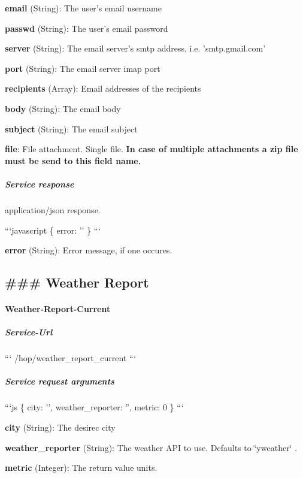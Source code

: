 \begin{DoxyItemize}
\item {\bfseries email} (String)\-: The user's email username
\item {\bfseries passwd} (String)\-: The user's email password
\item {\bfseries server} (String)\-: The email server's smtp address, i.\-e. 'smtp.\-gmail.\-com'
\item {\bfseries port} (String)\-: The email server imap port
\item {\bfseries recipients} (Array)\-: Email addresses of the recipients
\item {\bfseries body} (String)\-: The email body
\item {\bfseries subject} (String)\-: The email subject
\item {\bfseries file}\-: File attachment. Single file. {\bfseries In case of multiple attachments a zip file must be send to this field name.}
\end{DoxyItemize}

\subparagraph*{Service response}

application/json response.

```javascript \{ error\-: '' \} ```


\begin{DoxyItemize}
\item {\bfseries error} (String)\-: Error message, if one occures.
\end{DoxyItemize}



 \subsection*{\#\#\# Weather Report }

\paragraph*{Weather-\/\-Report-\/\-Current}

\subparagraph*{Service-\/\-Url}

``` /hop/weather\-\_\-report\-\_\-current ```

\subparagraph*{Service request arguments}

```js \{ city\-: '', weather\-\_\-reporter\-: '', metric\-: 0 \} ```


\begin{DoxyItemize}
\item {\bfseries city} (String)\-: The desirec city
\item {\bfseries weather\-\_\-reporter} (String)\-: The weather A\-P\-I to use. Defaults to \char`\"{}yweather\char`\"{} .
\item {\bfseries metric} (Integer)\-: The return value units.
\end{DoxyItemize}

